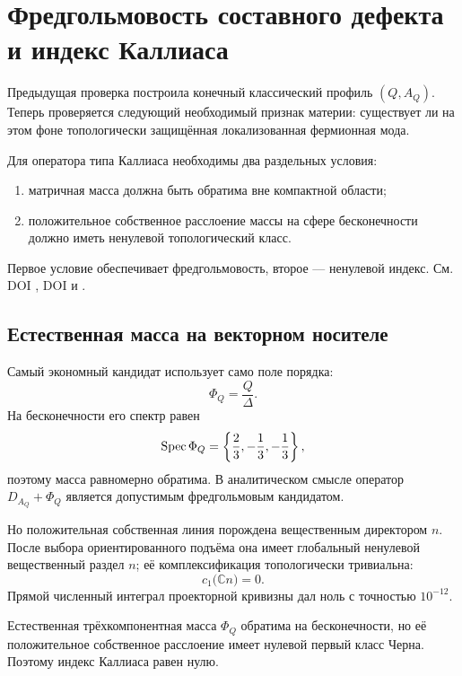 \chapter{Фредгольмовость составного дефекта и индекс Каллиаса}

Предыдущая проверка построила конечный классический профиль $(Q,A_Q)$. Теперь
проверяется следующий необходимый признак материи: существует ли на этом
фоне топологически защищённая локализованная фермионная мода.

Для оператора типа Каллиаса необходимы два раздельных условия:
\begin{enumerate}
 \item матричная масса должна быть обратима вне компактной области;
 \item положительное собственное расслоение массы на сфере бесконечности
 должно иметь ненулевой топологический класс.
\end{enumerate}
Первое условие обеспечивает фредгольмовость, второе --- ненулевой индекс.
См. DOI , DOI
 и .

\section{Естественная масса на векторном носителе}

Самый экономный кандидат использует само поле порядка:
\begin{equation}
 \Phi_Q=\frac Q\Delta.
\end{equation}
На бесконечности его спектр равен
\begin{equation}
 \operatorname{Spec}\Phi_Q=\left\{\frac23,-\frac13,-\frac13\right\},
\end{equation}
поэтому масса равномерно обратима. В аналитическом смысле оператор
$D_{A_Q}+\Phi_Q$ является допустимым фредгольмовым кандидатом.

Но положительная собственная линия порождена вещественным директором
$n$. После выбора ориентированного подъёма она имеет глобальный
ненулевой вещественный раздел $n$; её комплексификация топологически
тривиальна:
\begin{equation}
 c_1\bigl(\mathbb C n\bigr)=0.
 \label{eq:v6-vector-callias-zero-chern}
\end{equation}
Прямой численный интеграл проекторной кривизны дал ноль с точностью
$10^{-12}$.

\begin{theorem}
Естественная трёхкомпонентная масса $\Phi_Q$ обратима на бесконечности, но
её положительное собственное расслоение имеет нулевой первый класс Черна.
Поэтому индекс Каллиаса равен нулю.
\end{theorem}

